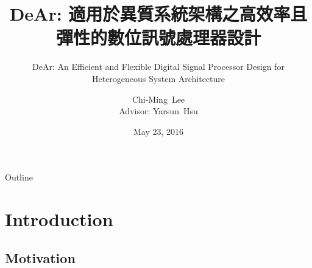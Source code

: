 \documentclass[handout]{beamer}
\author[Chi-Ming~Lee]{ 
    Chi-Ming~Lee\\{\small Advisor: Yarsun~Hsu}
}
\institute[NTHU EE] %
{
    Department of Electrial Engineering\\
    National Tsing Hua University
}
\date{May 23, 2016}
\begin{document}
\begin{CJK}{UTF8}{bkai}

    \title[DeAr DSP]{ DeAr: 適用於異質系統架構之高效率且彈性的數位訊號處理器設計}
    \subtitle{DeAr: An Efficient and Flexible Digital Signal Processor Design for Heterogeneous System Architecture}

    \begin{frame}
        \titlepage
    \end{frame}

    \begin{frame}{Outline}
        \tableofcontents
    \end{frame}


    \section{Introduction}

    \subsection{Motivation}


\end{CJK}
\end{document}
